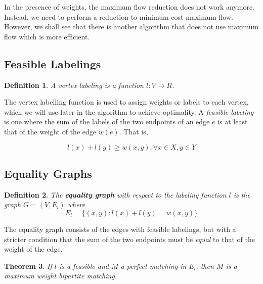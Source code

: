 \documentclass{article}
\newtheorem{theorem}{Theorem}
\newtheorem{definition}[theorem]{Definition}
\begin{document}
In the presence of weights, the maximum flow reduction does not work anymore. Instead, we need to perform a reduction to minimum cost maximum flow. However, we shall see that there is another algorithm that does not use maximum flow which is more efficient.

\subsection{Feasible Labelings}

\begin{definition}
A vertex labeling is a function $l : V \rightarrow R$. 
\end{definition}

The vertex labelling function is used to assign weights or labels to each vertex, which we will use later in the algorithm to achieve optimality. A \textit{feasible labeling} is one	where the sum of the labels of the two endpoints of an edge $e$ is at least that of the weight of the edge $w(e)$. That is,

\begin{equation*}
l(x) + l(y) \geq w(x, y), \forall x \in X, y \in Y
\end{equation*}

\subsection{Equality Graphs}

\begin{definition}
The \textbf{equality graph} with respect to the labeling function $l$ is the graph $G = (V, E_l)$ where 
\begin{equation*}
E_l = \{ (x, y) : l(x) + l(y) = w(x, y) \}
\end{equation*} 
\end{definition}

The equality graph consists of the edges with feasible labelings, but with a stricter condition that the sum of the two endpoints must be \textit{equal} to that of the weight of the edge.

\begin{theorem}
If $l$ is a feasible and $M$ a perfect matching in $E_l$, then $M$ is a maximum weight bipartite matching.
\end{theorem}
\end{document}
